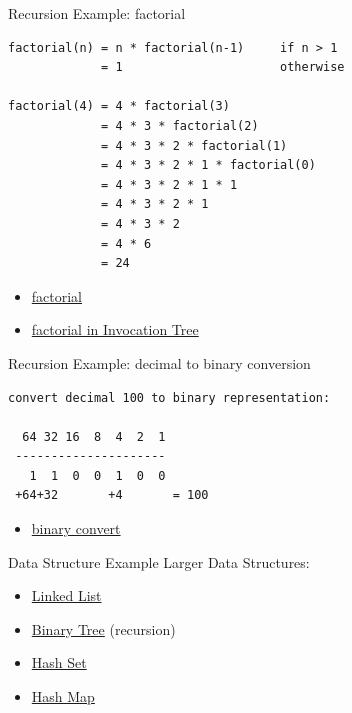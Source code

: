\documentclass[10pt, colorlinks=true, urlcolor=blue]{beamer}
\begin{document}
\begin{frame}[fragile]{Recursion Example: factorial}
\begin{verbatim}
factorial(n) = n * factorial(n-1)     if n > 1
             = 1                      otherwise

factorial(4) = 4 * factorial(3)
             = 4 * 3 * factorial(2)
             = 4 * 3 * 2 * factorial(1)
             = 4 * 3 * 2 * 1 * factorial(0)
             = 4 * 3 * 2 * 1 * 1
             = 4 * 3 * 2 * 1
             = 4 * 3 * 2
             = 4 * 6
             = 24
\end{verbatim}
\begin{itemize}
\item \href{https://memory-graph.com/\#codeurl=https://raw.githubusercontent.com/bterwijn/memory_graph/refs/heads/main/src/factorial.py}{factorial}
\item \href{https://invocation-tree.com/\#codeurl=https://raw.githubusercontent.com/bterwijn/memory_graph/refs/heads/main/src/factorial.py}{factorial in Invocation Tree}
\end{itemize}
\end{frame}

\begin{frame}[fragile]{Recursion Example: decimal to binary conversion}
\begin{verbatim}
convert decimal 100 to binary representation:

  64 32 16  8  4  2  1
 ---------------------
   1  1  0  0  1  0  0
 +64+32       +4       = 100

\end{verbatim}
\begin{itemize}
\item \href{https://memory-graph.com/\#codeurl=https://raw.githubusercontent.com/bterwijn/memory_graph/refs/heads/main/src/binary_convert.py}{binary convert}
\end{itemize}
\end{frame}

\begin{frame}{Data Structure Example}
Larger Data Structures:
\begin{itemize}
\item \href{https://memory-graph.com/\#codeurl=https://raw.githubusercontent.com/bterwijn/memory_graph/refs/heads/main/src/linked_list.py&timestep=0.2}{Linked List}
\item \href{https://memory-graph.com/\#codeurl=https://raw.githubusercontent.com/bterwijn/memory_graph/refs/heads/main/src/bin_tree.py&timestep=0.2}{Binary Tree} (recursion)
\item \href{https://memory-graph.com/\#codeurl=https://raw.githubusercontent.com/bterwijn/memory_graph/refs/heads/main/src/hash_set.py&timestep=0.2}{Hash Set}
\item \href{https://memory-graph.com/\#codeurl=https://raw.githubusercontent.com/bterwijn/memory_graph/refs/heads/main/src/hash_map.py&timestep=0.2}{Hash Map}
\end{itemize}
\end{frame}
\end{document}
